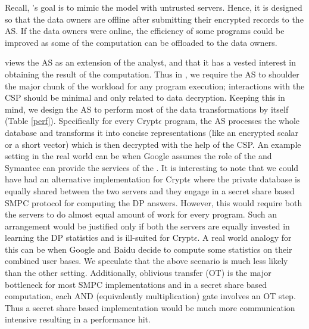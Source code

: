  Recall, \system's goal is to mimic the \cdp model with untrusted  servers. Hence, it is designed so that the data owners are offline after submitting their encrypted records to the \textsf{AS}. %
 If the data owners were online, the efficiency of some programs could be improved as some of the computation %
 can be offloaded to the data owners.



 \system views the \textsf{AS} as an extension of the analyst, and that it has a vested interest in obtaining the result of the computation.   Thus in \system, we require the \textsf{AS} to  shoulder the major chunk of the workload for any \system program execution; interactions with the \textsf{CSP} should be minimal and only related to data decryption. Keeping this in  mind, we design the \textsf{AS} to perform most of the data transformations by itself (Table \ref{perf}). Specifically for every Crypt$\epsilon$ program, the \textsf{AS} processes the whole database and transforms it into concise representations (like an encrypted scalar or a short vector) which is then decrypted with the help of the \textsf{CSP}. An example setting in the real world can be when Google assumes the role of the \AS and Symantec can provide the services of the \CSP. It is interesting to note that we could have had an alternative implementation for Crypt$\epsilon$ where the private database is equally shared between the two servers and they engage in a secret share based SMPC protocol for computing the DP answers. However, this would require both the servers to do almost equal amount of work for every program. Such an arrangement would be justified only if both the servers are equally invested in learning the DP statistics and is ill-suited for Crypt$\epsilon$. A real world analogy for this can be when Google and Baidu decide to compute some statistics on their combined user bases. We speculate that the above scenario is much less likely than the other setting. Additionally, oblivious transfer (OT) is the major bottleneck for most SMPC implementations \cite{OT:bottleneck:1,OT:bottleneck:2,OT:bottleneck:3} and in a secret share based computation, each AND (equivalently multiplication) gate involves an OT step. Thus a secret share based implementation would be much more communication intensive resulting in a performance hit. 

